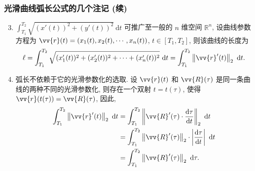 \begin{frame}
\frametitle{光滑曲线弧长公式的几个注记 (续)}

\begin{enumerate}[<+->]
\setcounter{enumi}{2}
\item $\int_{T_1}^{T_2} \sqrt{(x'(t))^2 + (y'(t))^2} ~ \mathrm{d}t$ 可推广至一般的 $n$ 维空间 $\mathbb{R}^n$, 设曲线参数方程为 $\vv{r}(t) = (x_1(t), x_2(t), \cdots, x_n(t))$, $t \in [T_1, T_2]$, 则该曲线的长度为
\[
\ell = \int_{T_1}^{T_2} \sqrt{(x_1'(t))^2 + (x_2'(t))^2 + \cdots + (x_n'(t))^2} ~ \mathrm{d}t = \int_{T_1}^{T_2} \left\lVert \vv{r}'(t) \right\rVert_2 ~ \mathrm{d}t.
\]
\item 弧长不依赖于它的光滑参数化的选取. 设 $\vv{r}(t)$ 和 $\vv{R}(\tau)$ 是同一条曲线的两种不同的光滑参数化, 则存在一个双射 $t = t(\tau)$, 使得 $\vv{r}(t(\tau)) = \vv{R}(\tau)$, 因此,
\begin{align*}
\int_{T_1}^{T_2} \left\lVert \vv{r}'(t) \right\rVert_2 ~ \mathrm{d}t & = \int_{T_1}^{T_2} \left\lVert \vv{R}'(\tau) \cdot \frac{\mathrm{d}\tau}{\mathrm{d}t} \right\rVert_2 ~ \mathrm{d}t \\
& = \int_{T_1}^{T_2} \left\lVert \vv{R}'(\tau) \right\rVert_2 \cdot \left\lvert \frac{\mathrm{d}\tau}{\mathrm{d}t} \right\rvert ~ \mathrm{d}t \\
& = \int_{T_1}^{T_2} \left\lVert \vv{R}'(\tau) \right\rVert_2 ~ \mathrm{d}\tau.
\end{align*}
\end{enumerate}

\end{frame}


